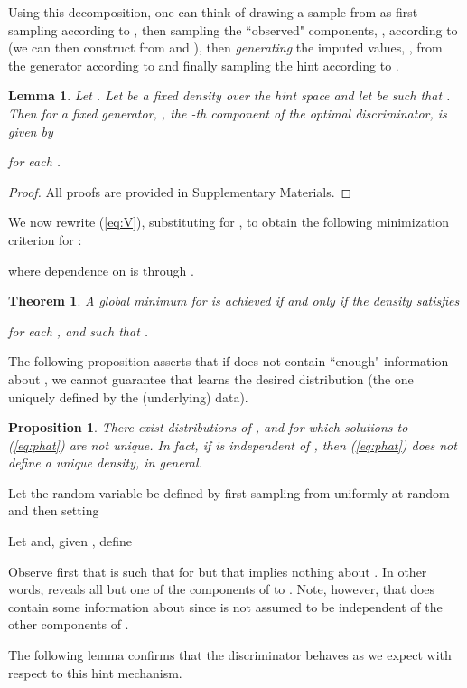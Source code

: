 \documentclass{article}
\newtheorem{theorem}{Theorem}
\newtheorem{proposition}{Proposition}
\newtheorem{lemma}{Lemma}
\begin{document}
Using this decomposition, one can think of drawing a sample from  as first sampling  according to , then sampling the ``observed" components, , according to  (we can then construct  from  and ), then {\em generating} the imputed values, , from the generator according to  and finally sampling the hint according to .

\begin{lemma} \label{lem:D}
	Let . Let  be a fixed density over the hint space  and let  be such that .	Then for a fixed generator, , the -th component of the optimal discriminator,  is given by
	
	for each .
\end{lemma}
\begin{proof}
	All proofs are provided in Supplementary Materials.
\end{proof}

We now rewrite (\ref{eq:V}), substituting for , to obtain the following minimization criterion for :

where dependence on  is through .

\begin{theorem} \label{thm:main}
 	A global minimum for  is achieved if and only if the density  satisfies
	
	for each ,  and  such that .
\end{theorem}

The following proposition asserts that if  does not contain ``enough" information about , we cannot guarantee that  learns the desired distribution (the one uniquely defined by the (underlying) data).

\begin{proposition} \label{prop:nonunique}
	There exist distributions of ,  and  for which solutions to (\ref{eq:phat}) are not unique. In fact, if  is independent of , then (\ref{eq:phat}) does not define a unique density, in general.
\end{proposition}

Let the random variable  be defined by first sampling  from  uniformly at random and then setting 

Let  and, given , define

Observe first that  is such that  for  but that  implies nothing about . In other words,  reveals all but one of the components of  to . Note, however, that  does contain some information about  since  is not assumed to be independent of the other components of .

The following lemma confirms that the discriminator behaves as we expect with respect to this hint mechanism.
\end{document}
